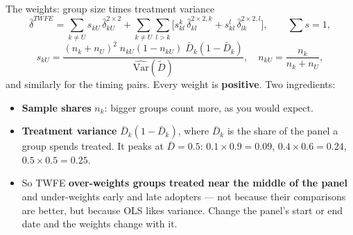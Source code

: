 \documentclass[
  11pt,
  ignorenonframetext,
  aspectratio=169,
]{beamer}
\providecommand{\tightlist}{%
  \setlength{\itemsep}{0pt}\setlength{\parskip}{0pt}}
\begin{document}
\begin{frame}{The weights: group size times treatment variance}
\protect{}\label{the-weights-group-size-times-treatment-variance}
\[
\hat\delta^{TWFE} = \sum_{k \ne U} s_{kU}\,\hat\delta^{2\times2}_{kU} + \sum_{k \ne U}\sum_{l > k}\big[s^{k}_{kl}\,\hat\delta^{2\times2,k}_{kl} + s^{l}_{kl}\,\hat\delta^{2\times2,l}_{lk}\big], \qquad \sum s = 1,
\] \[
s_{kU} = \frac{(n_k + n_U)^2\; n_{kU}(1 - n_{kU})\; \bar D_k(1 - \bar D_k)}{\widehat{\text{Var}}(\tilde D)}, \quad n_{kU} = \frac{n_k}{n_k + n_U},
\] and similarly for the timing pairs. Every weight is
\textbf{positive}. Two ingredients:

\begin{itemize}
\tightlist
\item
  \textbf{Sample shares} \(n_k\): bigger groups count more, as you would
  expect.
\item
  \textbf{Treatment variance} \(\bar D_k(1-\bar D_k)\), where
  \(\bar D_k\) is the share of the panel a group spends treated. It
  peaks at \(\bar D = 0.5\): \(0.1 \times 0.9 = 0.09\),
  \(0.4 \times 0.6 = 0.24\), \(0.5 \times 0.5 = 0.25\).
\item
  So TWFE \textbf{over-weights groups treated near the middle of the
  panel} and under-weights early and late adopters --- not because their
  comparisons are better, but because OLS likes variance. Change the
  panel's start or end date and the weights change with it.
\end{itemize}
\end{frame}
\end{document}
